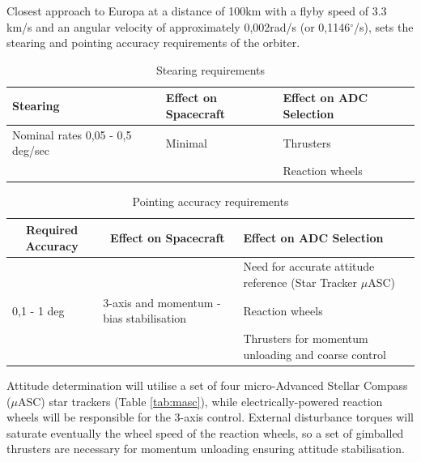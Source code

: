 Closest approach to Europa at a distance of 100km with a flyby speed of 3.3 km/s and an angular velocity of approximately 0,002rad/s (or 0,1146$^{\circ}$/s), sets the stearing and pointing accuracy requirements of the orbiter. 
\begin{table}[h!]
  \centering
    \begin{tabular}{|p{}|p{}|p{}|}
    \hline
    \textbf{Stearing} & \textbf{Effect on Spacecraft} & \textbf{Effect on ADC Selection} \bigstrut\\
    \hline
    Nominal rates 0,05 - 0,5 deg/sec & Minimal & Thrusters \bigstrut\\
\cline{3-3}          &       & Reaction wheels \bigstrut\\
    \hline
    \end{tabular}%
    \caption{Stearing requirements \cite {spacemissionanalysis}}
  \label{tab:stearing_req}%
\end{table}%

\begin{table}[h!]
  \centering
    \begin{tabular}{|p{}|p{}|p{}|}
    \hline
    \multicolumn{1}{|c|}{\textbf{Required Accuracy}} & \multicolumn{1}{c|}{\textbf{Effect on Spacecraft}} & \textbf{Effect on ADC Selection} \bigstrut\\
    \hline
          &       & Need for accurate attitude reference (Star Tracker $\mu$ASC) \bigstrut\\
\cline{3-3}    0,1 - 1 deg & 3-axis and momentum - bias stabilisation & Reaction wheels \bigstrut\\
\cline{3-3}          &       & Thrusters for momentum unloading and coarse control \bigstrut\\
    \hline
    \end{tabular}%
    \caption{Pointing accuracy requirements \cite {spacemissionanalysis}}
  \label{tab:point_acc_req}%
\end{table}%
Attitude determination will utilise a set of four micro-Advanced Stellar Compass ($\mu$ASC) star trackers (Table \ref{tab:masc}), while electrically-powered reaction wheels will be responsible for the 3-axis control. External disturbance torques will saturate eventually the wheel speed of the reaction wheels, so a set of gimballed thrusters are necessary for  momentum unloading ensuring attitude stabilisation.


